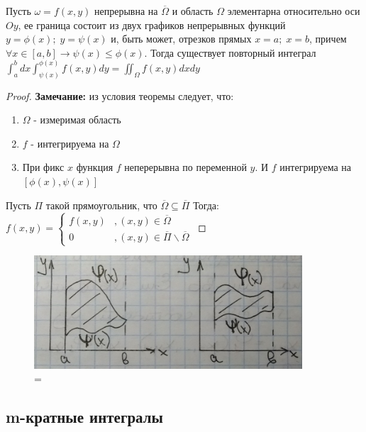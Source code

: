 \begin{theorem}
	Пусть $\omega=f(x,y)$ непрерывна на $\overline{\Omega} $ и область $\Omega$ элементарна относительно оси $Oy$, ее граница состоит из двух графиков непрерывных функций $y=\phi(x);\; y=\psi(x) $ и, быть может, отрезков прямых $x=a; \; x=b $, причем $\forall x\in [a,b] \rightarrow  \psi(x) \leq \phi(x).$ Тогда существует повторный интеграл $\int_a^b dx \int_{\psi(x)}^{\phi(x)} f(x,y) dy = \iint_{\Omega} f(x,y) dxdy $
\end{theorem}
\begin{proof}
	\textbf{Замечание:} из условия теоремы следует, что: 
	\begin{enumerate}
		\item $\Omega $ - измеримая область
		\item $f$ - интегрируема на $\Omega$
		\item При фикс $x$  функция $ f$ неперерывна по переменной $y$. И $f$ интегрируема на $[\phi(x), \psi(x)] $
	\end{enumerate}
	
	Пусть $\Pi$ такой прямоугольник, что $\overline{\Omega}\subseteq \overline{\Pi} $
	Тогда: $f(x,y)=\begin{cases}
		f(x,y)&, (x,y) \in \overline{\Omega}\\
		0&, (x,y) \in  \overline{\Pi}\backslash \overline{\Omega}
	\end{cases}$
	
\end{proof}

	\begin{figure}[H]
	\includegraphics[width=100mm]{lect7pic1}
	\\
=
\end{figure}


\subsection{m-кратные интегралы}



